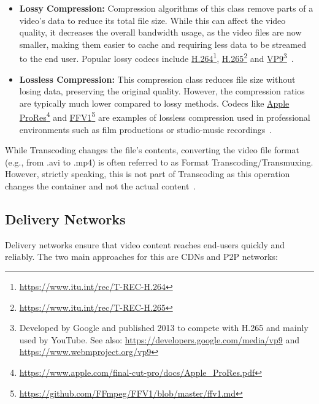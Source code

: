 \begin{itemize}
    \item \textbf{Lossy Compression:} Compression algorithms of this class remove parts of a video's data to reduce its total file size. 
    While this can affect the video quality, it decreases the overall bandwidth usage, as the video files are now smaller, making them easier to cache and requiring less data to be streamed to the end user. Popular lossy codecs include \href{https://www.itu.int/rec/T-REC-H.264}{H.264}\footnote{\url{https://www.itu.int/rec/T-REC-H.264}}, \href{https://www.itu.int/rec/T-REC-H.265}{H.265}\footnote{\url{https://www.itu.int/rec/T-REC-H.265}} and \href{https://developers.google.com/media/vp9}{VP9}\footnote{Developed by Google and published 2013 to compete with H.265 and mainly used by YouTube. See also: \url{https://developers.google.com/media/vp9} and \url{https://www.webmproject.org/vp9}}~\parencite{combression}.
    \item \textbf{Lossless Compression:} This compression class reduces file size without losing data, preserving the original quality. However, the compression ratios are typically much lower compared to lossy methods. Codecs like \href{https://www.apple.com/final-cut-pro/docs/Apple_ProRes.pdf}{Apple ProRes}\footnote{\url{https://www.apple.com/final-cut-pro/docs/Apple_ProRes.pdf}} and \href{https://github.com/FFmpeg/FFV1/blob/master/ffv1.md}{FFV1}\footnote{\url{https://github.com/FFmpeg/FFV1/blob/master/ffv1.md}} are examples of lossless compression used in professional environments such as film productions or studio-music recordings~\parencite{combression}.
\end{itemize}

\noindent While Transcoding changes the file's contents, converting the video file format (e.g., from .avi to .mp4) is often referred to as Format Transcoding/Transmuxing. However, strictly speaking, this is not part of Transcoding as this operation changes the container and not the actual content~\parencite{transcoding}.

\subsection{Delivery Networks}
Delivery networks ensure that video content reaches end-users quickly and reliably. The two main approaches for this are \ac{CDN}s and \ac{P2P} networks:

